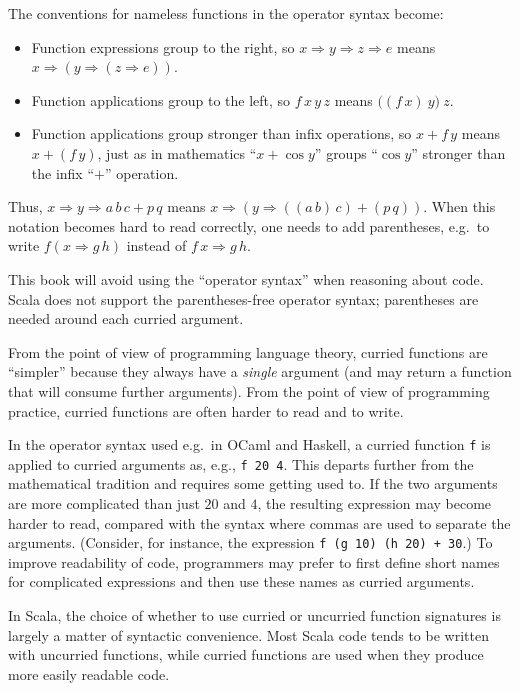 The conventions for nameless functions in the operator syntax become:
\begin{itemize}
\item Function expressions group to the right, so $x\Rightarrow y\Rightarrow z\Rightarrow e$
means $x\Rightarrow\left(y\Rightarrow\left(z\Rightarrow e\right)\right)$.
\item Function applications group to the left, so $f\,x\,y\,z$ means $\big((f\,x)\:y\big)\:z$.
\item Function applications group stronger than infix operations, so $x+f\,y$
means $x+(f\,y)$, just as in mathematics ``$x+\cos y$'' groups
``$\cos y$'' stronger than the infix ``$+$'' operation.
\end{itemize}
Thus, $x\Rightarrow y\Rightarrow a\,b\,c+p\,q$ means $x\Rightarrow\left(y\Rightarrow\left(\left(a\,b\right)\,c\right)+(p\,q)\right)$.
When this notation becomes hard to read correctly, one needs to add
parentheses, e.g.\ to write $f(x\Rightarrow g\,h)$ instead of $f\,x\Rightarrow g\,h$.

This book will avoid using the ``operator syntax'' when reasoning
about code. Scala does not support the parentheses-free operator syntax;
parentheses are needed around each curried argument.

From the point of view of programming language theory, curried functions
are ``simpler'' because they always have a \emph{single} argument
(and may return a function that will consume further arguments). From
the point of view of programming practice, curried functions are often
harder to read and to write.

In the operator syntax used e.g.\ in OCaml and Haskell, a curried
function \lstinline!f! is applied to curried arguments as, e.g.,
\lstinline!f 20 4!. This departs further from the mathematical tradition
and requires some getting used to. If the two arguments are more complicated
than just $20$ and $4$, the resulting expression may become harder
to read, compared with the syntax where commas are used to separate
the arguments. (Consider, for instance, the expression \lstinline!f (g 10) (h 20) + 30!.)
To improve readability of code, programmers may prefer to first define
short names for complicated expressions and then use these names as
curried arguments.

In Scala, the choice of whether to use curried or uncurried function
signatures is largely a matter of syntactic convenience. Most Scala
code tends to be written with uncurried functions, while curried functions
are used when they produce more easily readable code.

